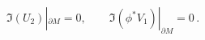 \begin{equation}
\Im \left( U_2 \right)|_{\partial M}=0,\qquad
\Im \left( \phi^* V_1 \right)|_{\partial M}=0 \,.
\label{bcU2V1}
\end{equation}

